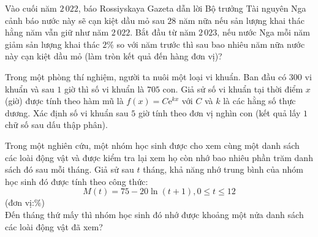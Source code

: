 \begin{ex}%
	Vào cuối năm $2\,022$, báo Rossiyskaya Gazeta dẫn lời Bộ trưởng Tài nguyên Nga  cảnh báo nước này sẽ cạn kiệt dầu mỏ sau $28$ năm nữa nếu sản lượng khai thác hằng năm vẫn giữ như năm $2\,022$. Bắt đầu từ năm $2\,023$, nếu nước Nga mỗi năm giảm sản lượng khai thác $2\%$ so với năm trước thì sau bao nhiêu năm nữa nước này cạn kiệt dầu mỏ (làm tròn kết quả đến hàng đơn vị)?
\end{ex}

\begin{ex}%
	Trong một phòng thí nghiệm, người ta nuôi một loại vi khuẩn. Ban đầu có $300$ vi khuẩn và sau $1$ giờ thì số vi khuẩn là $705$ con. Giả sử số vi khuẩn tại thời điểm $x$ (giờ) được tính theo hàm mũ là $f(x) = C\mathrm{e}^{kx}$ với $C$ và $k$ là các hằng số thực dương. Xác định số vi khuẩn  sau $5$ giờ tính theo đơn vị nghìn con (kết quả lấy $1$ chữ số sau dấu thập phân).
\end{ex}

\begin{ex}%
	Trong một nghiên cứu, một nhóm học sinh được cho xem cùng một danh sách các loài động vật và được kiểm tra lại xem họ còn nhớ bao nhiêu phần trăm danh sách đó sau mỗi tháng. Giả sử sau $t$  tháng, khả năng nhớ trung bình của nhóm học sinh đó được tính theo công thức:
	$$ 
	M(t)=75-20 \ln (t+1), 0 \leq t  \leq 12
	 $$
	 (đơn vị:$\%$)\\
	Đến tháng thứ  mấy thì nhóm học sinh đó nhớ được khoảng một nửa danh sách các loài động vật đã xem?
\end{ex}

